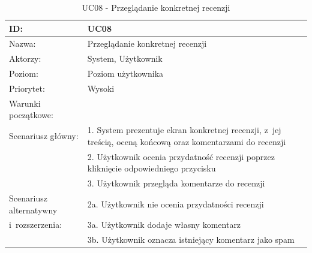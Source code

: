 \begin{table}[H]
    \begin{tabular}{|p{5cm}|p{9cm}|}\hline
    ID: & UC08 \\\hline
    Nazwa: & Przeglądanie konkretnej recenzji \\\hline
    Aktorzy: & System, Użytkownik \\\hline
    Poziom: & Poziom użytkownika  \\\hline
    Priorytet: & Wysoki \\\hline
    Warunki początkowe: & ~ \\\hline
    Scenariusz główny: & 1. System prezentuje ekran konkretnej recenzji, z~jej treścią, oceną końcową oraz komentarzami do recenzji \\
    ~ & 2. Użytkownik ocenia przydatność recenzji poprzez kliknięcie odpowiedniego przycisku \\
    ~ & 3. Użytkownik przegląda komentarze do recenzji \\\hline
    Scenariusz alternatywny & 2a. Użytkownik nie ocenia przydatności recenzji \\
    i~rozszerzenia: & 3a. Użytkownik dodaje własny komentarz \\
    ~ & 3b. Użytkownik oznacza istniejący komentarz jako spam \\
    \hline\end{tabular}
	\caption{UC08 - Przeglądanie konkretnej recenzji}
\end{table}

